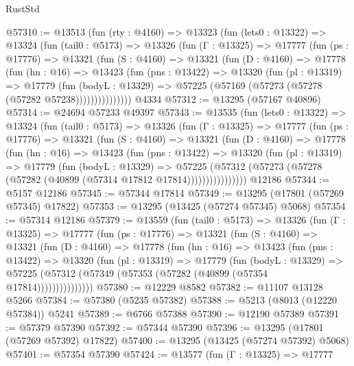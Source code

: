 \begin{lexlean}{RustStd}
\begin{coremodule}
@57310 := @13513
    (fun (rty : @4160) =>
    @13323
      (fun (lets0 : @13322) =>
      @13324
        (fun (tail0 : @5173) =>
        @13326
          (fun (Γ : @13325) =>
          @17777
            (fun (ps : @17776) =>
            @13321
              (fun (S : @4160) =>
              @13321
                (fun (D : @4160) =>
                @17778
                  (fun (hn : @16) =>
                  @13423
                    (fun (pns : @13422) =>
                    @13320
                      (fun (pl : @13319) =>
                      @17779
                        (fun (bodyL : @13329) =>
                        @57225 (@57169 (@57273 (@57278 (@57282 @57238)))))))))))))))
    @4334
@57312 := @13295 (@57167 @40896)
@57314 := @24694 @57233 @49397
@57343 := @13535
    (fun (lets0 : @13322) =>
    @13324
      (fun (tail0 : @5173) =>
      @13326
        (fun (Γ : @13325) =>
        @17777
          (fun (ps : @17776) =>
          @13321
            (fun (S : @4160) =>
            @13321
              (fun (D : @4160) =>
              @17778
                (fun (hn : @16) =>
                @13423
                  (fun (pns : @13422) =>
                  @13320
                    (fun (pl : @13319) =>
                    @17779
                      (fun (bodyL : @13329) =>
                      @57225
                        (@57312
                          (@57273 (@57278 (@57282 (@40899 (@57314 @17812 @17814))))))))))))))))
    @12186
@57344 := @5157 @12186
@57345 := @57344 @17814
@57349 := @13295 (@17801 (@57269 @57345) @17822)
@57353 := @13295 (@13425 (@57274 @57345) @5068)
@57354 := @57314 @12186
@57379 := @13559
    (fun (tail0 : @5173) =>
    @13326
      (fun (Γ : @13325) =>
      @17777
        (fun (ps : @17776) =>
        @13321
          (fun (S : @4160) =>
          @13321
            (fun (D : @4160) =>
            @17778
              (fun (hn : @16) =>
              @13423
                (fun (pns : @13422) =>
                @13320
                  (fun (pl : @13319) =>
                  @17779
                    (fun (bodyL : @13329) =>
                    @57225 (@57312 (@57349 (@57353 (@57282 (@40899 (@57354 @17814)))))))))))))))
@57380 := @12229 @8582
@57382 := @11107 @13128 @5266
@57384 := @57380 (@5235 @57382)
@57388 := @5213 (@8013 (@12220 @57384)) @5241
@57389 := @6766 @57388
@57390 := @12190 @57389
@57391 := @57379 @57390
@57392 := @57344 @57390
@57396 := @13295 (@17801 (@57269 @57392) @17822)
@57400 := @13295 (@13425 (@57274 @57392) @5068)
@57401 := @57354 @57390
@57424 := @13577
    (fun (Γ : @13325) =>
    @17777

\end{coremodule}
\end{lexlean}
